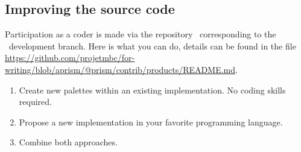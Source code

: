 \documentclass{tutodoc}
\begin{document}

\subsection{Improving the source code}
\label{contrib-how-to-src-code}

Participation as a coder is made via the repository \thisrepo\ corresponding to the \thisproj\ development branch.
Here is what you can do, details can be found in the file \url{https://github.com/projetmbc/for-writing/blob/aprism/@prism/contrib/products/README.md}.

\begin{enumerate}
    \item Create new palettes within an existing implementation. No coding skills required.
    
    \item Propose a new implementation in your favorite programming language.
    
    \item Combine both approaches.
\end{enumerate}
\end{document}
